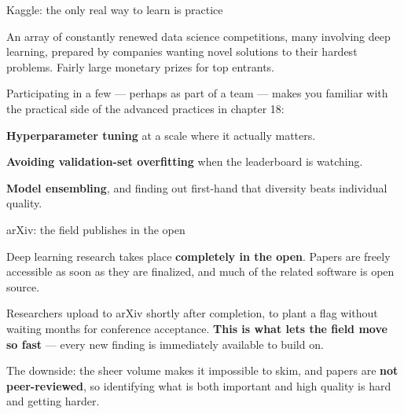 \documentclass[aspectratio=169,11pt,t]{beamer}
\begin{document}
\begin{frame}[shrink=25]{Kaggle: the only real way to learn is practice}
{\fontsize{9.4}{12.6}\selectfont\color{fg2}An array of constantly renewed data science competitions, many involving deep learning, prepared by companies wanting novel solutions to their hardest problems. Fairly large monetary prizes for top entrants.\par}\vskip 4pt
{\fontsize{9.4}{12.6}\selectfont\color{fg2}Participating in a few --- perhaps as part of a team --- makes you familiar with the practical side of the advanced practices in chapter 18:\par}\vskip 4pt
\begin{ibullets}
\item \textbf{Hyperparameter tuning} at a scale where it actually matters.
\item \textbf{Avoiding validation-set overfitting} when the leaderboard is watching.
\item \textbf{Model ensembling}, and finding out first-hand that diversity beats individual quality.
\end{ibullets}
\end{frame}

\begin{frame}[shrink=25]{arXiv: the field publishes in the open}
{\fontsize{9.4}{12.6}\selectfont\color{fg2}Deep learning research takes place \textbf{completely in the open}. Papers are freely accessible as soon as they are finalized, and much of the related software is open source.\par}\vskip 4pt
{\fontsize{9.4}{12.6}\selectfont\color{fg2}Researchers upload to arXiv shortly after completion, to plant a flag without waiting months for conference acceptance. \textbf{This is what lets the field move so fast} --- every new finding is immediately available to build on.\par}\vskip 4pt
\begin{iband}[amber]
The downside: the sheer volume makes it impossible to skim, and papers are \textbf{not peer-reviewed}, so identifying what is both important and high quality is hard and getting harder. 
\end{iband}
\end{frame}
\end{document}
